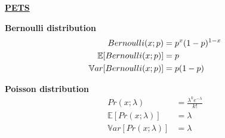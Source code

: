 \documentclass[landscape,a0paper,fontscale=0.285]{baposter} %
\begin{document}
\begin{poster}
{\underline{\textbf{PETS}}


\colorbox[HTML]{CCFFFF}{}
\textbf{Bernoulli distribution}\vspace{-0.3cm}
$$\vspace{-0.3cm}
\begin{aligned}
Bernoulli(x;p) &= p^x(1-p)^{1-x}\\
\mathbb  E[Bernoulli(x;p)] &= p\\
\mathbb Var[Bernoulli(x;p)] &= p(1-p)
\end{aligned}
$$

\textbf{Poisson distribution}\vspace{-0.3cm}
$$
\begin{aligned}
Pr(x;\lambda) &= \frac{\lambda^k e^{-\lambda}}{k!}\\
\mathbb E[Pr(x;\lambda)] &= \lambda\\
\mathbb Var[Pr(x;\lambda)] &= \lambda\\
\end{aligned}
$$
}
\end{poster}
\end{document}
